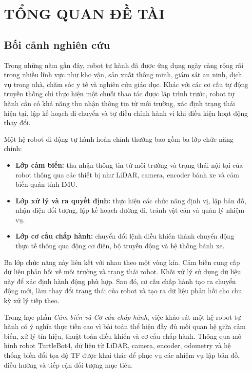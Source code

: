 \section{TỔNG QUAN ĐỀ TÀI}

\subsection{Bối cảnh nghiên cứu}

Trong những năm gần đây, robot tự hành đã được ứng dụng ngày càng rộng rãi trong nhiều lĩnh vực như kho vận, sản xuất thông minh, giám sát an ninh, dịch vụ trong nhà, chăm sóc y tế và nghiên cứu giáo dục. Khác với các cơ cấu tự động truyền thống chỉ thực hiện một chuỗi thao tác được lập trình trước, robot tự hành cần có khả năng thu nhận thông tin từ môi trường, xác định trạng thái hiện tại, lập kế hoạch di chuyển và tự điều chỉnh hành vi khi điều kiện hoạt động thay đổi.

Một hệ robot di động tự hành hoàn chỉnh thường bao gồm ba lớp chức năng chính:

\begin{itemize}
    \item \textbf{Lớp cảm biến:} thu nhận thông tin từ môi trường và trạng thái nội tại của robot thông qua các thiết bị như LiDAR, camera, encoder bánh xe và cảm biến quán tính IMU.
    
    \item \textbf{Lớp xử lý và ra quyết định:} thực hiện các chức năng định vị, lập bản đồ, nhận diện đối tượng, lập kế hoạch đường đi, tránh vật cản và quản lý nhiệm vụ.
    
    \item \textbf{Lớp cơ cấu chấp hành:} chuyển đổi lệnh điều khiển thành chuyển động thực tế thông qua động cơ điện, bộ truyền động và hệ thống bánh xe.
\end{itemize}

Ba lớp chức năng này liên kết với nhau theo một vòng kín. Cảm biến cung cấp dữ liệu phản hồi về môi trường và trạng thái robot. Khối xử lý sử dụng dữ liệu này để xác định hành động phù hợp. Sau đó, cơ cấu chấp hành tạo ra chuyển động mới, làm thay đổi trạng thái của robot và tạo ra dữ liệu phản hồi cho chu kỳ xử lý tiếp theo.

Trong học phần \textit{Cảm biến và Cơ cấu chấp hành}, việc khảo sát một hệ robot tự hành có ý nghĩa thực tiễn cao vì bài toán thể hiện đầy đủ mối quan hệ giữa cảm biến, xử lý tín hiệu, thuật toán điều khiển và cơ cấu chấp hành. Thông qua mô hình robot TurtleBot4, dữ liệu từ LiDAR, camera, encoder, odometry và hệ thống biến đổi tọa độ TF được khai thác để phục vụ các nhiệm vụ lập bản đồ, điều hướng và tiếp cận đối tượng mục tiêu.

